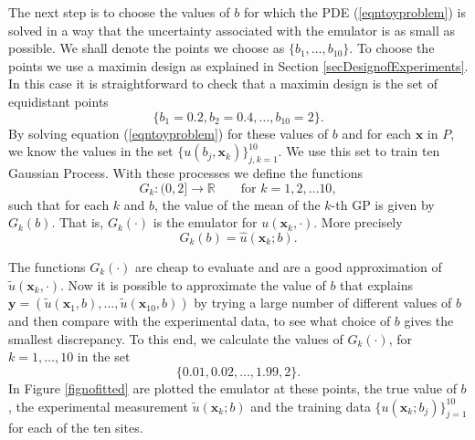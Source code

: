 \documentclass{sfuthesis}
\newcommand{\x}{\textbf{x}}
\newcommand{\y}{\textbf{y}}
\begin{document}
The next step is to choose  the values of $b$  for which the  PDE (\ref{eqntoyproblem}) is solved in a 
way that the uncertainty associated with the emulator is as small as possible. 
We shall denote the points we choose as $\{b_{1},\dots,b_{10}\}$. To choose the points 
we use a maximin design as explained in  Section \ref{secDesignofExperiments}. In this case
it is straightforward to check that a maximin design is the set of equidistant points
\begin{equation*}
\{b_{1}=0.2,b_{2}=0.4,\ldots,b_{10}=2\}.
\end{equation*}
\newline 
By solving equation (\ref{eqntoyproblem}) for these values of $b$ and for 
each $\x$ in $P$, we know the values in the set $\{u(b_{j},\x_{k})\}_{j,k=1}^{10}$.
We use this set  to train ten Gaussian Process. With these processes we define the functions 
\begin{equation*}
G_{k}:(0,2]\rightarrow\mathbb{R}\qquad\text{for }k=1,2,\ldots 10,
\end{equation*}
such that  for each $k$ and $b$,  the value of the mean of the $k$-th GP is given by $G_{k}(b)$.
That is, $G_{k}(\cdot)$ is the emulator for $u(\x_{k},\cdot)$. More precisely
\begin{equation*}
G_{k}(b)=\hat{u}(\x_{k};b).
\end{equation*} 

The functions $G_{k}(\cdot)$ are cheap to evaluate and are a good 
approximation of $\tilde{u}(\x_{k},\cdot)$. Now it is possible
to approximate the value of $b$ that explains $\y=(\tilde{u}(\x_{1},b),
\ldots,\tilde{u}(\x_{10},b))$ by trying a large number of different values
of $b$ and then compare with the experimental data, to see what choice
of $b$ gives the smallest discrepancy. To this end, we calculate
the values of $G_{k}(\cdot)$, for $k=1,\ldots,10$ in the set
\begin{equation*}
\{0.01,0.02,\ldots,1.99,2\}.
\end{equation*} 
In Figure \ref{fignofitted} are plotted  
the emulator at these points,  the true value of $b$, the experimental measurement $\tilde{u}(\x_{k};b)$
and the training data $\{u(\x_{k};b_{j})\}_{j=1}^{10}$ for each of the ten sites.



%
%
\end{document}
